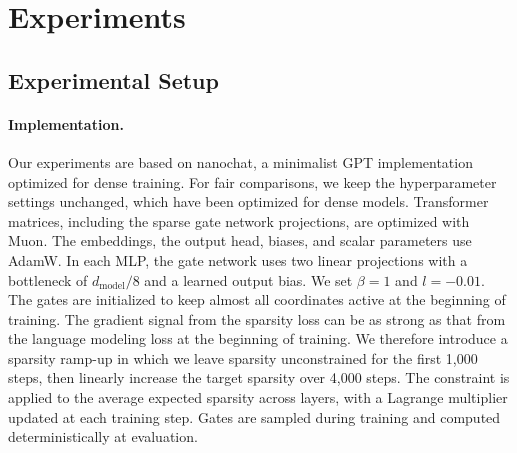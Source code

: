\section{Experiments}
\label{sec:zon-results}

\subsection{Experimental Setup}
\paragraph{Implementation.}
Our experiments are based on nanochat, a minimalist GPT implementation optimized
for dense training. For fair comparisons, we keep the hyperparameter
settings unchanged, which have been optimized for dense models. Transformer matrices,
including the sparse gate network projections, are optimized with Muon.
The embeddings, the output head, biases, and scalar parameters use AdamW.
In each MLP, the gate network uses two linear projections with a bottleneck
of $d_{\text{model}}/8$ and a learned output bias. We set $\beta=1$ and $l=-0.01$.
The gates are initialized to keep almost all coordinates active at the beginning of training.
The gradient signal from the sparsity loss can be as strong as that from the language modeling
loss at the beginning of training.
We therefore introduce a sparsity ramp-up in which we leave sparsity unconstrained
for the first 1,000 steps, then linearly increase the target sparsity over 4,000 steps.
The constraint is applied to the average expected sparsity across layers,
with a Lagrange multiplier updated at each training step.
Gates are sampled during training and computed deterministically at evaluation.

